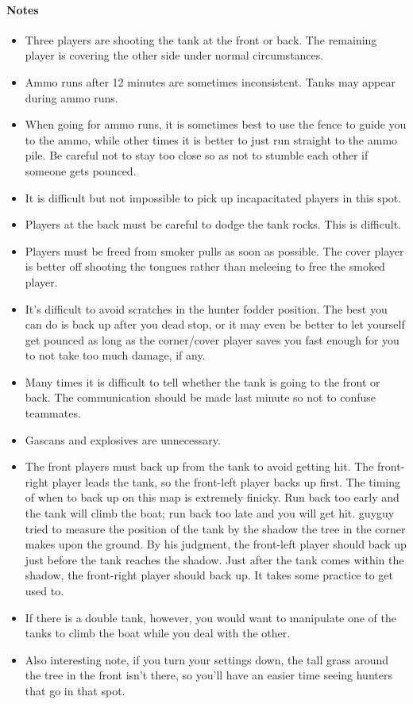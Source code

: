 \paragraph{Notes}
\begin{itemize}
\item Three players are shooting the tank at the front or back. The remaining player is covering the other side under normal circumstances.
\item Ammo runs after 12 minutes are sometimes inconsistent. Tanks may appear during ammo runs.
\item When going for ammo runs, it is sometimes best to use the fence to guide you to the ammo, while other times it is better to just run straight to the ammo pile. Be careful not to stay too close so as not to stumble each other if someone gets pounced.
\item It is difficult but not impossible to pick up incapacitated players in this spot.
\item Players at the back must be careful to dodge the tank rocks. This is difficult.
\item Players must be freed from smoker pulls as soon as possible. The cover player is better off shooting the tongues rather than meleeing to free the smoked player.
\item It's difficult to avoid scratches in the hunter fodder position. The best you can do is back up after you dead stop, or it may even be better to let yourself get pounced as long as the corner/cover player saves you fast enough for you to not take too much damage, if any.
\item Many times it is difficult to tell whether the tank is going to the front or back. The communication should be made last minute so not to confuse teammates.
\item Gascans and explosives are unnecessary.
\item The front players must back up from the tank to avoid getting hit. The front-right player leads the tank, so the front-left player backs up first. The timing of when to back up on this map is extremely finicky. Run back too early and the tank will climb the boat; run back too late and you will get hit. guyguy tried to measure the position of the tank by the shadow the tree in the corner makes upon the ground. By his judgment, the front-left player should back up just before the tank reaches the shadow. Just after the tank comes within the shadow, the front-right player should back up. It takes some practice to get used to.
\item If there is a double tank, however, you would want to manipulate one of the tanks to climb the boat while you deal with the other. 
\item Also interesting note, if you turn your settings down, the tall grass around the tree in the front isn't there, so you'll have an easier time seeing hunters that go in that spot.
\end{itemize}


